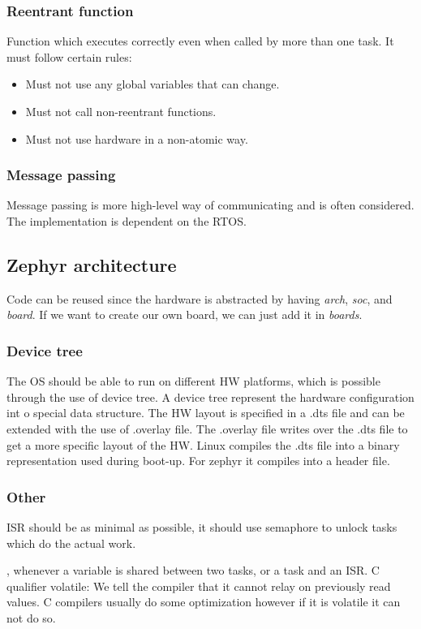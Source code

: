 \subsubsection{Reentrant function}
Function which executes correctly even when called by more than one task.
It must follow certain rules:
\begin{itemize}
    \item Must not use any global variables that can change.
    \item Must not call non-reentrant functions.
    \item Must not use hardware in a non-atomic way.
\end{itemize}

\subsubsection{Message passing}
Message passing is more high-level way of communicating and is often considered.
The implementation is dependent on the RTOS.

\subsection{Zephyr architecture}
Code can be reused since the hardware is abstracted by having \textit{arch}, \textit{soc}, and \textit{board}.
If we want to create our own board, we can just add it in \textit{boards}.

\subsubsection{Device tree}
The OS should be able to run on different HW platforms, which is possible through the use of device tree.
A device tree represent the hardware configuration int o special data structure.
The HW layout is specified in a .dts file and can be extended with the use of .overlay file.
The .overlay file writes over the .dts file to get a more specific layout of the HW.
Linux compiles the .dts file into a binary representation used during boot-up. 
For zephyr it compiles into a header file.

\subsubsection{Other}
ISR should be as minimal as possible, it should use semaphore to unlock tasks which do the actual work.

, whenever a variable is shared between two tasks, or a task and an ISR.
C qualifier volatile: We tell the compiler that it cannot relay on previously read values. 
C compilers usually do some optimization however if it is volatile it can not 
do so.

